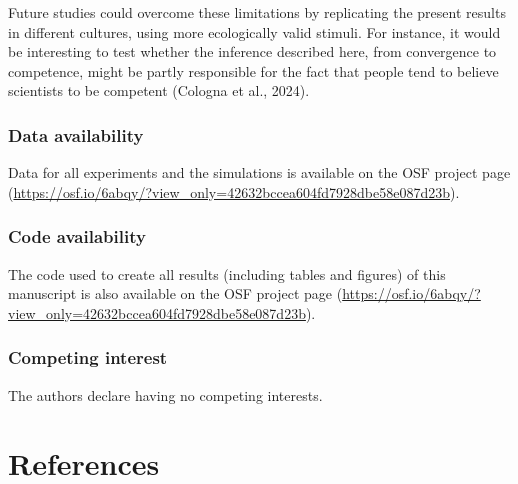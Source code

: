 \documentclass[
  doc,floatsintext]{apa6}
\begin{document}
Future studies could overcome these limitations by replicating the present results in different cultures, using more ecologically valid stimuli. For instance, it would be interesting to test whether the inference described here, from convergence to competence, might be partly responsible for the fact that people tend to believe scientists to be competent (Cologna et al., 2024).

\subsubsection{Data availability}\label{data-availability}

Data for all experiments and the simulations is available on the OSF project page (\url{https://osf.io/6abqy/?view_only=42632bccea604fd7928dbe58e087d23b}).

\subsubsection{Code availability}\label{code-availability}

The code used to create all results (including tables and figures) of this manuscript is also available on the OSF project page (\url{https://osf.io/6abqy/?view_only=42632bccea604fd7928dbe58e087d23b}).

\subsubsection{Competing interest}\label{competing-interest}

The authors declare having no competing interests.

\FloatBarrier

\section{References}\label{references}
\end{document}
